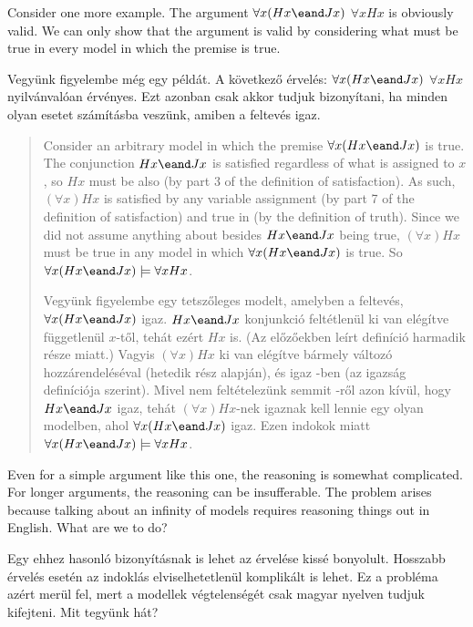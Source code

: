 

Consider one more example. The argument $\forall x(Hx \eand Jx)$ \therefore  $\forall x Hx$ is obviously valid. We can only show that the argument is valid by considering what must be true in every model in which the premise is true.

Vegyünk figyelembe még egy példát. A következő érvelés: $\forall x(Hx \eand Jx)$ \therefore $\forall x Hx$ nyilvánvalóan érvényes. Ezt azonban csak akkor tudjuk bizonyítani, ha minden olyan esetet számításba veszünk, amiben a feltevés igaz.

\begin{quote}
Consider an arbitrary model  in which the premise $\forall x(Hx \eand Jx)$ is true. The conjunction $Hx \eand Jx$ is satisfied regardless of what is assigned to $x$, so $Hx$ must be also (by part 3 of the definition of {satisfaction}). As such, $(\forall x) Hx$ is satisfied by any variable assignment (by part 7 of the definition of {satisfaction}) and true in  (by the definition of {truth}).
Since we did not assume anything about  besides $Hx \eand Jx$ being true, $(\forall x) Hx$ must be true in any model in which $\forall x(Hx \eand Jx)$ is true. So $\forall x(Hx \eand Jx) \models \forall x Hx$.

Vegyünk figyelembe egy tetszőleges  modelt, amelyben a feltevés, $\forall x(Hx \eand Jx)$ igaz. $Hx \eand Jx$ konjunkció feltétlenül ki van elégítve függetlenül $x$-től, tehát ezért $Hx$ is. (Az előzőekben leírt definíció harmadik része miatt.) Vagyis $(\forall x)Hx$ ki van elégítve bármely változó hozzárendeléséval (hetedik rész alapján), és igaz -ben (az igazság definíciója szerint). Mivel nem feltételezünk semmit -ről azon kívül, hogy$Hx \eand Jx$ igaz, tehát $(\forall x) Hx$-nek igaznak kell lennie egy olyan modelben, ahol $\forall x(Hx \eand Jx)$ igaz. Ezen indokok miatt $\forall x(Hx \eand Jx) \models \forall x Hx$.
\end{quote}

Even for a simple argument like this one, the reasoning is somewhat complicated. For longer arguments, the reasoning can be insufferable. The problem arises because talking about an infinity of models requires reasoning things out in English. What are we to do?

Egy ehhez hasonló bizonyításnak is lehet az érvelése kissé bonyolult. Hosszabb érvelés esetén az indoklás elviselhetetlenül komplikált is lehet. Ez a probléma azért merül fel, mert a modellek végtelenségét csak magyar nyelven tudjuk kifejteni. Mit tegyünk hát?

